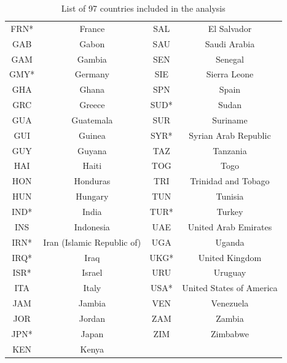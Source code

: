 \documentclass[a4paper]{article}
\begin{document}
\begin{appendices}
\begin{table}[H]
\begin{tabular}{c|c||c|c}
			FRN* & France&SAL & El Salvador\\
			GAB & Gabon 	&SAU & Saudi Arabia\\
			GAM & Gambia	&SEN &Senegal \\
				GMY* & Germany& SIE&Sierra Leone \\
			 	GHA & Ghana	&SPN & Spain\\
			GRC & Greece&SUD* &Sudan \\
				GUA & Guatemala &SUR&Suriname\\
				GUI &Guinea&SYR* & Syrian Arab Republic\\
		GUY & Guyana	&TAZ & Tanzania\\
				HAI & Haiti  &TOG & Togo\\
					HON &Honduras&TRI & Trinidad and Tobago\\
			HUN & Hungary 	&TUN & Tunisia\\
				IND* & India&TUR*& Turkey\\
			INS & Indonesia		&UAE & United Arab Emirates\\
	IRN* & Iran (Islamic Republic of)		& UGA & Uganda\\
			IRQ* & Iraq &UKG* & United Kingdom\\
				ISR* & Israel&URU & Uruguay\\
			ITA & Italy		&USA* & United States of America\\
		JAM& Jambia	&VEN & Venezuela\\
			JOR & Jordan	&ZAM & Zambia\\
			JPN* & Japan	&ZIM & Zimbabwe\\		
				KEN & Kenya&&\\
				\hline
\end{tabular}
	\label{table:importantvotes}
	\caption {List of 97 countries included in the analysis}
\end{table}

\end{appendices}
\end{document}
